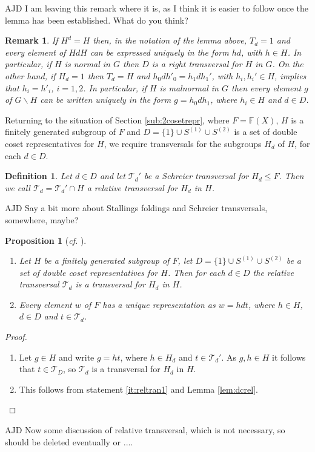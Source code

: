 \documentclass[a4paper,12pt]{article}
\newtheorem{proposition}[theorem]{Proposition}
\newtheorem{definition}[theorem]{Definition}
\newtheorem{remk}[theorem]{Remark}
\newenvironment{remark}{\begin{remk} \rm}{\end{remk}}
\numberwithin{equation}{section}
\numberwithin{figure}{section}
\newcommand{\FF}{\ensuremath{\mathbb{F}}}
\newcommand{\cT}{\mathcal{T}}
\newcommand{\bs}{\backslash}
\newcommand{\be}{\begin{enumerate}}
\newcommand{\ee}{\end{enumerate}}
\newenvironment{ajd1}{\noindent\color{red} AJD }{}
\newcommand{\ajd}[1]{\begin{ajd1} #1 \end{ajd1}}
\begin{document}
\ajd{I am leaving this remark where it is, as I think it is 
easier to follow once the lemma has been established. What do you think?}
\begin{remark}
If $H^d=H$ then, in the notation of the lemma above, $T_d=1$ and 
every element of $HdH$ can be expressed uniquely in the form $hd$, 
with $h\in H$. In particular, if $H$ is normal in $G$ then $D$ is 
a right transversal for $H$ in $G$. On the other hand, if $H_d=1$ then
$T_d=H$ and $h_0dh'_0=h_1dh_1'$, with $h_i,h_i'\in H$, implies that 
$h_i=h'_i$, $i=1,2$. In particular, if $H$ is malnormal in $G$ then 
every element $g$ of $G\bs H$ can be written uniquely in the form 
$g=h_0dh_1$, where $h_i\in H$ and $d\in D$. 
\end{remark}   

Returning to the situation of Section \ref{sub:2cosetrepr}, 
where  $F=\FF(X)$, $H$ is a finitely generated subgroup of $F$ and $D=\{1\}\cup S^{(1)}\cup
S^{(2)}$ is a set of double coset representatives for $H$, 
we require transversals for the subgroups $H_d$ of $H$, for each $d\in D$. 
\begin{definition}\label{def:reltran}
Let $d\in D$ and let  $\cT_d'$ be a Schreier transversal for $H_d\le F$.
 Then we call $\cT_d=\cT_d'\cap H$ a 
\emph{relative  transversal for } $H_d$ in $H$. 
\end{definition}  
\ajd{
Say a bit more about Stallings foldings and Schreier transversals, 
somewhere, maybe?} 
\begin{proposition}[\emph{cf.} {\cite[Lemma 3.9]{FrenkelRemeslennikov13}}] \label{prop:reltran}
\be
\item\label{it:reltran1} 
Let $H$ be a finitely generated subgroup of $F$, let   $D=\{1\}\cup S^{(1)}\cup
S^{(2)}$ be a set of double coset representatives for $H$. Then for  each $d\in D$ the relative
transversal 
$\cT_d$ is a  transversal for $H_d$ in $H$.   
\item Every element $w$ of $F$ has a unique representation as 
$w=hdt$, where $h\in H$, $d\in D$ and $t\in \cT_d$. 
\ee
\end{proposition}
\begin{proof}
\be 
\item Let $g\in H$ and write $g=ht$,  where $h\in H_d$ and $t\in \cT_d'$.
As $g,h\in H$ it follows that $t\in \cT_D$, so $\cT_d$ is a transversal for 
$H_d$ in $H$.
\item This follows from statement \ref{it:reltran1} and Lemma 
\ref{lem:dcrel}. 
\ee
\end{proof}
\ajd{Now some discussion of relative transversal, which is not necessary, 
so should be deleted eventually or ....}
\end{document}
